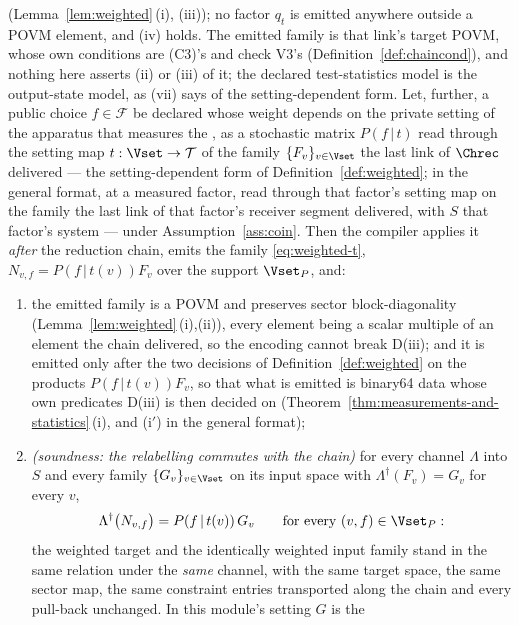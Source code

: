 \begin{theorem}
(Lemma~\ref{lem:weighted}\,(i), (iii)); no factor $q_t$ is emitted anywhere
outside a POVM element, and (iv) holds. The emitted family is that link's
target POVM, whose own conditions are (C3)'s and check V3's
(Definition~\ref{def:chaincond}), and
nothing here asserts (ii) or (iii) of it; the declared test-statistics model
is the output-state model, as (vii) says of the setting-dependent form.
Let, further, a public choice $f\in\mathcal{F}$ be declared whose weight
depends on the private setting of the apparatus that measures the
, as a
stochastic matrix $P(f\,|\,t)$ read through the setting map
$t:\Vset\to\mathcal{T}$ of the family $\{F_v\}_{v\in\Vset}$ the last link of
$\Chrec$ delivered --- the setting-dependent form of
Definition~\ref{def:weighted}; in the general format, at a measured factor,
read through that factor's setting map on the family the last link of that
factor's receiver segment delivered, with $S$ that factor's system --- under
Assumption~\ref{ass:coin}. Then the compiler applies it \emph{after} the
reduction chain, emits the family \eqref{eq:weighted-t},
$N_{v,f}=P(f\,|\,t(v))F_v$ over the support $\Vset_P$, and:
\begin{enumerate}[label=(\roman*),leftmargin=2.2em,resume]
\item the emitted family is a POVM and preserves sector block-diagonality
(Lemma~\ref{lem:weighted}\,(i),(ii)), every element being a scalar multiple
of an element the chain delivered, so the encoding cannot break D(iii); and it
is emitted only after the two decisions of Definition~\ref{def:weighted} on
the products $P(f\,|\,t(v))F_v$, so that what is emitted is binary64 data
whose own predicates D(iii) is then decided on
(Theorem~\ref{thm:measurements-and-statistics}\,(i), and (i$'$) in the
general format);
\item \emph{(soundness: the relabelling commutes with the chain)} for every
channel $\Lambda$ into $S$ and every family $\{G_v\}_{v\in\Vset}$ on its
input space with $\Lambda^{\dagger}(F_v)=G_v$ for every $v$,
\begin{equation}\label{eq:relabel-sound}
  \Lambda^{\dagger}\big(N_{v,f}\big)=P(f\,|\,t(v))\,G_v
  \qquad\text{for every }(v,f)\in\Vset_P :
\end{equation}
the weighted target and the identically weighted input family stand in the
same relation under the \emph{same} channel, with the same target space, the
same sector map, the same constraint entries transported along the chain and
every pull-back unchanged. In this module's setting $G$ is the

\end{enumerate}
\end{theorem}
